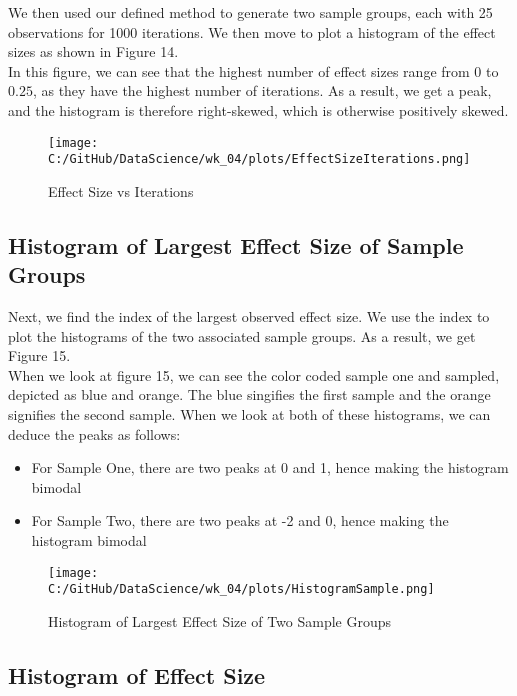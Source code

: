 \documentclass[a4paper,twocolumn]{article}
\begin{document}
We then used our defined method to generate two sample groups, each with 25 observations for 1000 iterations. 
We then move to plot a histogram of the effect sizes as shown in Figure 14. \\ 

In this figure, we can see that the highest number of effect sizes range from 0 to $0.25$, as they have the highest
number of iterations. As a result, we get a peak, and the histogram is therefore right-skewed, which is otherwise 
positively skewed.

\begin{figure}[htbp] 
    \centering
    \noindent
    \texttt{[image: C:/GitHub/DataScience/wk\_04/plots/EffectSizeIterations.png]}
    \caption{Effect Size vs Iterations} 
\end{figure}

\subsection{Histogram of Largest Effect Size of Sample Groups}
Next, we find the index of the largest observed effect size. We use the index to plot the histograms of the
two associated sample groups. As a result, we get Figure 15. \\

When we look at figure 15, we can see the color coded sample one and sampled, depicted as blue and orange. The blue 
singifies the first sample and the orange signifies the second sample. When we look at both of these histograms,
we can deduce the peaks as follows:
\begin{itemize}
    \item For Sample One, there are two peaks at 0 and 1, hence making the histogram bimodal
    \item For Sample Two, there are two peaks at -2 and 0, hence making the histogram bimodal
\end{itemize}

\begin{figure}[htbp] 
    \centering
    \noindent
    \texttt{[image: C:/GitHub/DataScience/wk\_04/plots/HistogramSample.png]}
    \caption{Histogram of Largest Effect Size of Two Sample Groups} 
\end{figure}

\newpage

\subsection{Histogram of Effect Size}
\end{document}
